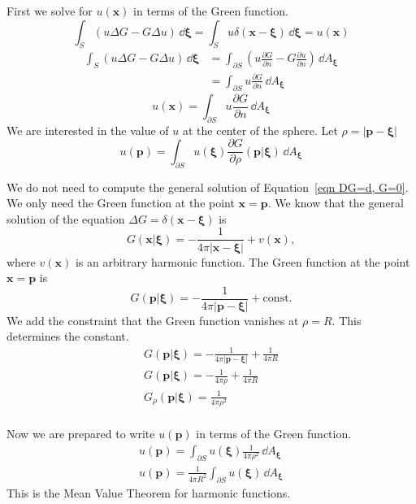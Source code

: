 {\begin{Solution}
First we solve for $u(\mathbf{x})$ in terms of the Green function.
\[
\int_S (u \Delta G - G \Delta u) \,\dd \boldsymbol{\xi}
= \int_S u \delta(\mathbf{x} - \boldsymbol{\xi}) \,\dd \boldsymbol{\xi}
= u(\mathbf{x})
\]
\begin{align*}
  \int_S (u \Delta G - G \Delta u) \,\dd \boldsymbol{\xi}
  &= \int_{\partial S} \left( u \frac{\partial G}{\partial n} - G \frac{\partial u}{\partial n} \right) \,\dd A_{\boldsymbol{\xi}}
  \\
  &= \int_{\partial S} u \frac{\partial G}{\partial n} \,\dd A_{\boldsymbol{\xi}}
\end{align*}
\[
u(\mathbf{x}) = \int_{\partial S} u \frac{\partial G}{\partial n} \,\dd A_{\boldsymbol{\xi}}
\]
We are interested in the value of $u$ at the center of the sphere.  
Let $\rho = |\mathbf{p} - \boldsymbol{\xi}|$
\[
u(\mathbf{p}) = \int_{\partial S} u(\boldsymbol{\xi}) 
\frac{\partial G}{\partial \rho}(\mathbf{p}|\boldsymbol{\xi}) \,\dd A_{\boldsymbol{\xi}}
\]

We do not need to compute the general solution of 
Equation~\ref{eqn DG=d, G=0}.  We only need the Green function at the 
point $\mathbf{x} = \mathbf{p}$.  We know that the general solution of the
equation $\Delta G = \delta(\mathbf{x} - \boldsymbol{\xi})$ is 
\[
G(\mathbf{x}|\boldsymbol{\xi}) = - \frac{1}{4 \pi |\mathbf{x} - \boldsymbol{\xi}|}
+ v(\mathbf{x}),
\]
where $v(\mathbf{x})$ is an arbitrary harmonic function.
The Green function at the point $\mathbf{x} = \mathbf{p}$ is 
\[
G(\mathbf{p}|\boldsymbol{\xi}) = - \frac{1}{4 \pi |\mathbf{p} - \boldsymbol{\xi}|}
+ \mathrm{const}.
\]
We add the constraint that the Green function vanishes at $\rho = R$.  
This determines the constant.
\begin{gather*}
  G(\mathbf{p}|\boldsymbol{\xi}) = - \frac{1}{4 \pi |\mathbf{p} - \boldsymbol{\xi}|}
  + \frac{1}{4 \pi R}
  \\
  G(\mathbf{p}|\boldsymbol{\xi}) = - \frac{1}{4 \pi \rho}
  + \frac{1}{4 \pi R}
  \\
  G_\rho(\mathbf{p}|\boldsymbol{\xi}) = \frac{1}{4 \pi \rho^2}
  \\
\end{gather*}

Now we are prepared to write $u(\mathbf{p})$ in terms of the Green function.
\begin{gather*}
  u(\mathbf{p}) = \int_{\partial S} u(\boldsymbol{\xi}) \frac{1}{4 \pi \rho^2} \,\dd A_{\boldsymbol{\xi}}
  \\
  u(\mathbf{p}) = \frac{1}{4 \pi R^2} \int_{\partial S} u(\boldsymbol{\xi}) \,\dd A_{\boldsymbol{\xi}}
\end{gather*}
This is the Mean Value Theorem for harmonic functions.
\end{Solution}








}
